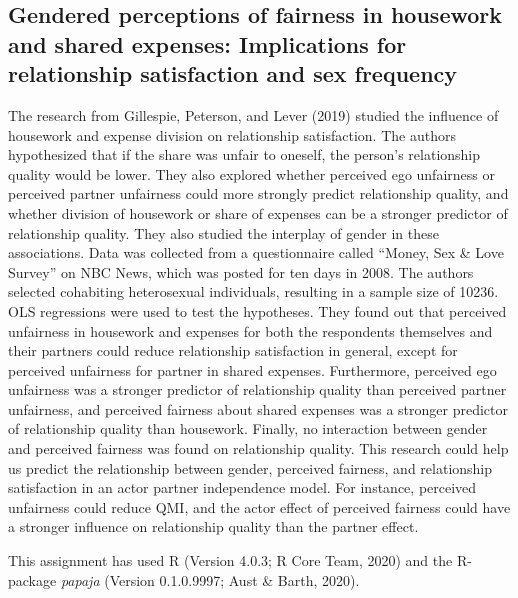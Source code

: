 \documentclass[
  english,
  man]{apa6}
\begin{document}
\hypertarget{gendered-perceptions-of-fairness-in-housework-and-shared-expenses-implications-for-relationship-satisfaction-and-sex-frequency}{%
\subsection{Gendered perceptions of fairness in housework and shared expenses: Implications for relationship satisfaction and sex frequency}\label{gendered-perceptions-of-fairness-in-housework-and-shared-expenses-implications-for-relationship-satisfaction-and-sex-frequency}}

The research from Gillespie, Peterson, and Lever (2019) studied the influence of housework and expense division on relationship satisfaction. The authors hypothesized that if the share was unfair to oneself, the person's relationship quality would be lower. They also explored whether perceived ego unfairness or perceived partner unfairness could more strongly predict relationship quality, and whether division of housework or share of expenses can be a stronger predictor of relationship quality. They also studied the interplay of gender in these associations. Data was collected from a questionnaire called ``Money, Sex \& Love Survey'' on NBC News, which was posted for ten days in 2008. The authors selected cohabiting heterosexual individuals, resulting in a sample size of 10236. OLS regressions were used to test the hypotheses. They found out that perceived unfairness in housework and expenses for both the respondents themselves and their partners could reduce relationship satisfaction in general, except for perceived unfairness for partner in shared expenses. Furthermore, perceived ego unfairness was a stronger predictor of relationship quality than perceived partner unfairness, and perceived fairness about shared expenses was a stronger predictor of relationship quality than housework. Finally, no interaction between gender and perceived fairness was found on relationship quality. This research could help us predict the relationship between gender, perceived fairness, and relationship satisfaction in an actor partner independence model. For instance, perceived unfairness could reduce QMI, and the actor effect of perceived fairness could have a stronger influence on relationship quality than the partner effect.

\hfill\break
\hfill\break

This assignment has used R (Version 4.0.3; R Core Team, 2020) and the R-package \emph{papaja} (Version 0.1.0.9997; Aust \& Barth, 2020).
\end{document}
